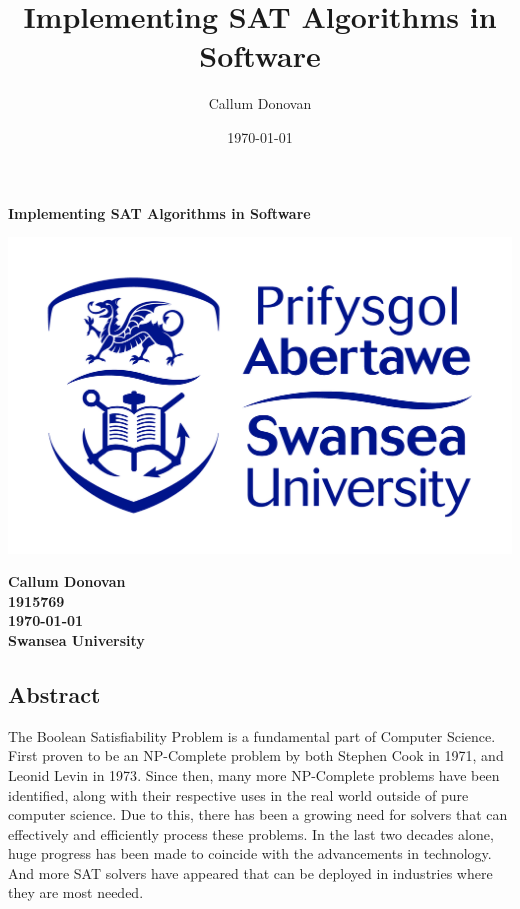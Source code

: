\documentclass{article}
\title{\bfseries Implementing SAT Algorithms in Software}
\author{Callum Donovan}
\date{ \today }
\begin{document}
\begin{titlepage}
    \begin{center}
        \Large{\bfseries Implementing SAT Algorithms in Software} \\
        \vspace*{\fill}
        \begin{center}
            \includegraphics[scale=0.15]{swan.jpg}
        \end{center}
        \vspace*{\fill}
        \bfseries{\large Callum Donovan \\
            1915769 \\
            \today \\
            Swansea University \\}
    \end{center}
\end{titlepage}

\thispagestyle{empty}
\begin{center}
\section*{Abstract}
\end{center}
The Boolean Satisfiability Problem is a fundamental part of Computer Science. First proven to be an
NP-Complete problem by both Stephen Cook in 1971\cite{scook}, and Leonid Levin in 1973\cite{levin}. Since then, many more
NP-Complete problems have been identified, along with their respective uses in the real world
outside of pure computer science. Due to this, there has been a growing need for solvers that can
effectively and efficiently process these problems. In the last two decades alone, huge progress has
been made to coincide with the advancements in technology. And more SAT solvers have appeared that
can be deployed in industries where they are most needed.
\end{document}
